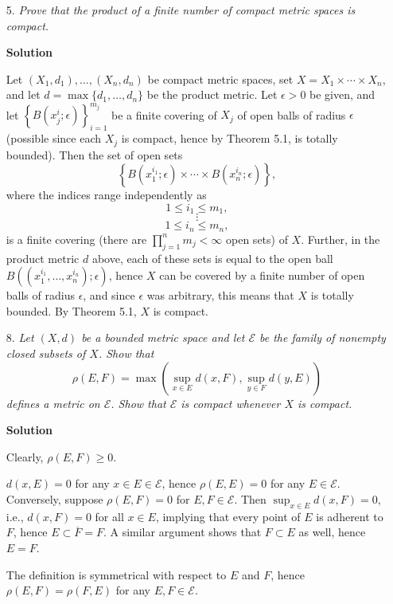 \documentclass{article}
\begin{document}
\begin{enumerate}
\begin{itemize}
\item[5.] {\em Prove that the product of a finite number of compact metric spaces is compact.}

{\bf Solution}

Let \((X_1,d_1), \ldots, (X_n,d_n)\) be compact metric spaces, set \(X = X_1 \times \cdots \times X_n\), and let \(d = \max \{d_1, \ldots, d_n\}\) be the product metric.  Let \(\epsilon > 0\) be given, and let \(\left\{ B(x_j^i;\epsilon) \right\}_{i = 1}^{m_j}\) be a finite covering of \(X_j\) of open balls of radius \(\epsilon\) (possible since each \(X_j\) is compact, hence by Theorem 5.1, is totally bounded).  Then the set of open sets
\[\left\{ B \left( x_1^{i_1}; \epsilon \right) \times \cdots \times
          B \left( x_n^{i_n}; \epsilon \right) \right\},\]
where the indices range independently as
\[1 \leq i_1 \leq m_1,\]
\[\vdots\]
\[1 \leq i_n \leq m_n,\]
is a finite covering (there are \(\prod_{j = 1}^n m_j < \infty\) open sets) of \(X\).  Further, in the product metric \(d\) above, each of these sets is equal to the open ball \(B \left( \left( x_1^{i_1}, \ldots, x_n^{i_n} \right); \epsilon \right)\), hence \(X\) can be covered by a finite number of open balls of radius \(\epsilon\), and since \(\epsilon\) was arbitrary, this means that \(X\) is totally bounded.  By Theorem 5.1, \(X\) is compact.



\item[8.] {\em Let \((X,d)\) be a bounded metric space and let \(\mathcal{E}\) be the family of nonempty closed subsets of \(X\).  Show that
\[\rho(E,F) = \max \left( \sup_{x \in E} d(x,F), \sup_{y \in F} d(y,E) \right)\]
defines a metric on \(\mathcal{E}\).  Show that \(\mathcal{E}\) is compact whenever \(X\) is compact.}

{\bf Solution}

Clearly, \(\rho(E,F) \geq 0\).

\(d(x,E) = 0\) for any \(x \in E \in \mathcal{E}\), hence \(\rho(E,E) = 0\) for any \(E \in \mathcal{E}\).  Conversely, suppose \(\rho(E,F) = 0\) for \(E,F \in \mathcal{E}\).  Then \(\sup_{x \in E} d(x,F) = 0\), i.e., \(d(x,F) = 0\) for all \(x \in E\), implying that every point of \(E\) is adherent to \(F\), hence \(E \subset \overline{F} = F\).  A similar argument shows that \(F \subset E\) as well, hence \(E = F\).

The definition is symmetrical with respect to \(E\) and \(F\), hence \(\rho(E,F) = \rho(F,E)\) for any \(E,F \in \mathcal{E}\).


\end{itemize}
\end{enumerate}
\end{document}
